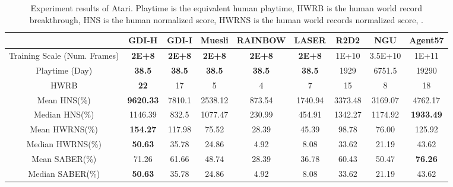 \documentclass[nohyperref]{article}
\def\GDIHmeanhns{9620.33}
\def\GDIHmedianhns{1146.39}
\def\GDIHHWRB{22}
\def\GDIHmeanHWRNS{154.27}
\def\GDIHmedianHWRNS{50.63}
\def\GDIHmeanSABER{71.26}
\def\GDIHmedianSABER{50.63}
\def\GDIHgametime{38.5}
\def\GDIImeanhns{7810.1}
\def\GDIImedianhns{832.5}
\def\GDIIHWRB{17}
\def\GDIImeanHWRNS{117.98}
\def\GDIImedianHWRNS{35.78}
\def\GDIImeanSABER{61.66}
\def\GDIImedianSABER{35.78}
\def\GDIIgametime{38.5}
\def\rainbowmeanhns{873.54}
\def\rainbowmedianhns{230.99}
\def\rainbowHWRB{4}
\def\rainbowmeanHWRNS{28.39}
\def\rainbowmedianHWRNS{4.92}
\def\rainbowmeanSABER{28.39}
\def\rainbowmedianSABER{4.92}
\def\rainbowgametime{38.5}
\def\lasermeanhns{1740.94}
\def\lasermedianhns{454.91}
\def\laserHWRB{7}
\def\lasermeanHWRNS{45.39}
\def\lasermedianHWRNS{8.08}
\def\lasermeanSABER{36.78}
\def\lasermedianSABER{8.08}
\def\lasergametime{38.5}
\def\rtdtmeanhns{3373.48}
\def\rtdtmedianhns{1342.27}
\def\rtdtHWRB{15}
\def\rtdtmeanHWRNS{98.78}
\def\rtdtmedianHWRNS{33.62}
\def\rtdtmeanSABER{60.43}
\def\rtdtmedianSABER{33.62}
\def\rtdtgametime{1929}
\def\ngumeanhns{3169.07}
\def\ngumedianhns{1174.92}
\def\nguHWRB{8}
\def\ngumeanHWRNS{76.00}
\def\ngumedianHWRNS{21.19}
\def\ngumeanSABER{50.47}
\def\ngumedianSABER{21.19}
\def\ngugametime{6751.5}
\def\agentmeanhns{4762.17}
\def\agentmedianhns{1933.49}
\def\agentHWRB{18}
\def\agentmeanHWRNS{125.92}
\def\agentmedianHWRNS{43.62}
\def\agentmeanSABER{76.26}
\def\agentmedianSABER{43.62}
\def\agentgametime{19290}
\def\mueslimeanhns{2538.12}
\def\mueslimedianhns{1077.47}
\def\muesliHWRB{5}
\def\mueslimeanHWRNS{75.52}
\def\mueslimedianHWRNS{24.86}
\def\mueslimeanSABER{48.74}
\def\mueslimedianSABER{24.86}
\def\muesligametime{38.5}
\theoremstyle{plain}
\begin{document}
\begin{table*}[!htbp]
\small
\setlength{\tabcolsep}{1.0pt}
    \centering
    \caption{Experiment results of Atari. Playtime is the equivalent human playtime, HWRB is the human world record breakthrough, HNS is the human normalized score, HWRNS is the human world records normalized score, .}
    \label{tab:atari_results}
    \begin{tabular}{c c c c c c c c c}
    \toprule
                      & GDI-H                   & GDI-I               & Muesli & RAINBOW & LASER & R2D2 & NGU & Agent57\\
    \midrule
     Training Scale (Num. Frames)      &\textbf{2E+8}        &\textbf{2E+8}       &\textbf{2E+8}  & \textbf{2E+8} & \textbf{2E+8}  & 1E+10   & 3.5E+10  &1E+11 \\
    Playtime (Day)  & \textbf{\GDIHgametime}       & \textbf{\GDIIgametime}      & \textbf{\muesligametime} & \textbf{\rainbowgametime} & \textbf{\lasergametime}  & \rtdtgametime   & \ngugametime    & \agentgametime \\
    HWRB              &\textbf{\GDIHHWRB}          &\GDIIHWRB         & \muesliHWRB             & \rainbowHWRB             & \laserHWRB              & \rtdtHWRB      & \nguHWRB & \agentHWRB \\
    Mean HNS(\%)      &\textbf{\GDIHmeanhns}     &\GDIImeanhns    & \mueslimeanhns        & \rainbowmeanhns        & \lasermeanhns        & \rtdtmeanhns &\ngumeanhns   &\agentmeanhns \\
    Median HNS(\%)    &\GDIHmedianhns               &\GDIImedianhns               & \mueslimedianhns        & \rainbowmedianhns        & \lasermedianhns         & \rtdtmedianhns & \ngumedianhns   &\textbf{\agentmedianhns}\\
    Mean HWRNS(\%)    &\textbf{\GDIHmeanHWRNS}      &\GDIImeanHWRNS              & \mueslimeanHWRNS         & \rainbowmeanHWRNS         & \lasermeanHWRNS           & \rtdtmeanHWRNS   & \ngumeanHWRNS     &\agentmeanHWRNS\\
    Median HWRNS(\%)  &\textbf{\GDIHmedianHWRNS}                &\GDIImedianHWRNS               & \mueslimedianHWRNS          & \rainbowmedianHWRNS          & \lasermedianHWRNS           &\rtdtmedianHWRNS    & \ngumedianHWRNS    &\agentmedianHWRNS\\
    Mean SABER(\%)    &\GDIHmeanSABER                &\GDIImeanSABER               & \mueslimeanSABER          & \rainbowmeanSABER         & \lasermeanSABER          &\rtdtmeanSABER    &\ngumeanSABER &\textbf{\agentmeanSABER}\\
    Median SABER(\%)  &\textbf{\GDIHmedianSABER}                & \GDIImedianSABER              & \mueslimedianSABER          & \rainbowmedianSABER         & \lasermedianSABER           &\rtdtmedianSABER    & \ngumedianSABER     &\agentmedianSABER\\
    \bottomrule
    \end{tabular}
\end{table*}
\normalsize
\end{document}
